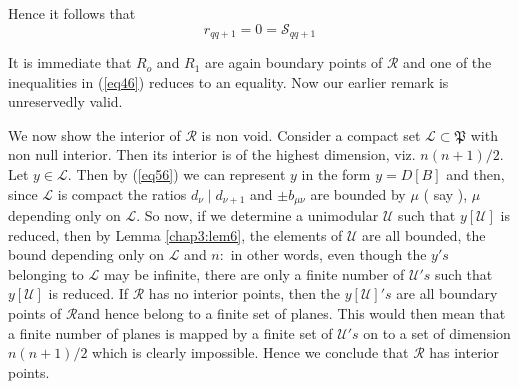 Hence  it follows that 
\begin{equation*}
r_{q q+1} = 0   = \mathscr{S}_{q q+1} \tag{67}\label{eq67}  
\end{equation*}

It is immediate that $R_o $ and $R_1 $ are again boundary points of $
\mathscr{R} $ and one of the inequalities in (\ref{eq46}) reduces to an
equality. Now our earlier remark is unreservedly valid. 

We now show the interior of $\mathscr{R}$ is non void. Consider a
compact set $ \mathscr{L} \subset \mathfrak{P} $ with non null
interior. Then its interior is of the  highest dimension, viz. $
n( n+1 ) / 2$. Let $ y \in \mathscr{L}$. Then by (\ref{eq56})
we can represent  $y$ in the form $y= D [ B ] $ and
then, since $ \mathscr{L} $ is compact the ratios $ d_\nu \mid d_{\nu
  +1 } $  and $ \pm b_{\mu \nu} $ are  bounded by $ \mu $ ( say ),
$ \mu $ depending only on $ \mathscr{L} $. So now, if we determine a
unimodular $ \mathcal{U} $  such that $ y [ \mathcal{U} ] $ is
reduced, then by Lemma \ref{chap3:lem6}, the elements of $\mathcal{U}$ are all
bounded, the bound depending only on $ \mathscr{L} $ and $ n : $  in
other words, even though the $y's$  belonging to $
\mathscr{L} $ may be infinite, there are only a finite number of $
\mathcal{U}'s$ such that $y[\mathcal{U} ] $ is
reduced. If $ \mathscr{R} $ has no interior points, then the $y[
  \mathcal{U} ]'s $ are all boundary points of 
$\mathscr{R}$\pageoriginale and hence belong to a finite set of
planes. This would 
then mean that a finite number of planes is mapped by a finite set of
$ \mathcal{U}'s$ on to a set of dimension  $ n ( n+1) /2 $
which is clearly impossible. Hence we conclude that
$\mathscr{R}$ has interior points. 
	

